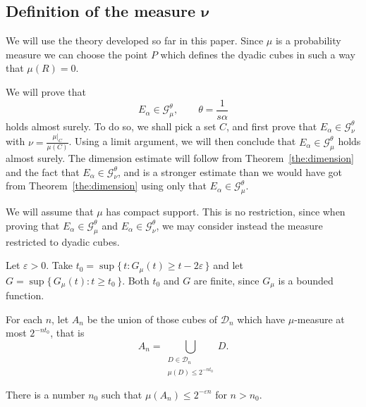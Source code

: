 \subsection{Definition of the measure \texorpdfstring{$\boldsymbol{\nu}$}{}}

We will use the theory developed so far in this paper. Since $\mu$ is a probability measure we can choose the point $P$ which defines the dyadic cubes in such a way that $\mu (R) = 0$.

We will prove that
\begin{equation*}
E_\alpha \in \mathscr{G}_\mu^\theta, \qquad \theta = \frac{1}{s
\alpha}
\end{equation*}
holds almost surely. To do so, we shall pick a set $C$, and first prove that $E_\alpha \in \mathscr{G}_\nu^\theta$ with $\nu =
\frac{\mu|_C}{\mu (C)}$. Using a limit argument, we will then conclude that $E_\alpha \in \mathscr{G}_\mu^\theta$ holds almost surely. The dimension estimate will follow from Theorem~\ref{the:dimension} and the fact that $E_\alpha \in \mathscr{G}_\nu^\theta$, and is a stronger estimate than we would have got from Theorem~\ref{the:dimension} using only that $E_\alpha \in \mathscr{G}_\mu^\theta$.

We will assume that $\mu$ has compact support. This is no restriction, since when proving that $E_\alpha \in \mathscr{G}_\mu^\theta$ and $E_\alpha \in \mathscr{G}_\nu^\theta$, we may consider instead the measure restricted to dyadic cubes.

Let $\varepsilon > 0$. Take $t_0 = \sup \{\, t : G_\mu (t) \geq t - 2
\varepsilon \,\}$ and let $G = \sup \{\, G_\mu (t) : t \geq t_0
\,\}$. Both $t_0$ and $G$ are finite, since $G_\mu$ is a bounded function.

For each $n$, let $A_n$ be the union of those cubes of $\mathscr{D}_n$ which have $\mu$-measure at most $2^{- n t_0}$, that is
\[
A_n = \bigcup_{\substack{D \in \mathscr{D}_n \\ \mu (D) \leq 2^{-n t_0}}} D.
\]

\begin{lemm}\label{lem:t0}
There is a number $n_0$ such that $\mu (A_n) \leq 2^{- \varepsilon n}$ for $n > n_0$.
\end{lemm}

